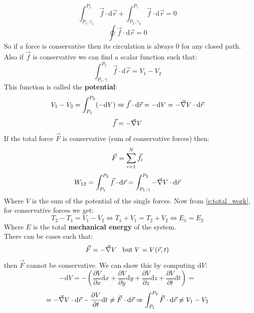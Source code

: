 \begin{equation}
    \int_{P_1,\gamma_1}^{P_2}\vec{f}\cdot\mathrm{d}\vec{r} + \int_{P_2,\gamma_2}^{P_1}\vec{f}\cdot\mathrm{d}\vec{r} = 0
\end{equation}
\begin{equation}
    \oint\vec{f}\cdot\mathrm{d}\vec{r} = 0
\end{equation}
So if a force is conservative then its circulation is always 0 for any closed path.\\
Also if $\vec{f}$ is conservative we can find a scalar function such that:
\begin{equation}
    \int_{P_1,\gamma}^{P_2}\vec{f}\cdot\mathrm{d}\vec{r} = V_1-V_2
\end{equation}
This function is called the \textbf{potential}:
\begin{equation}
    V_1-V_2 = \int_{P_1}^{P_2}(-\mathrm{d}V) \Rightarrow \vec{f}\cdot\mathrm{d}\vec{r} = -\mathrm{d}V = -\vec{\nabla} V \cdot \mathrm{d}\vec{r}
\end{equation}
\begin{equation}
    \vec{f} = -\vec{\nabla} V
\end{equation}
If the total force $\vec{F}$ is conservative (sum of conservative forces) then:
\begin{equation}
    \vec{F} = \displaystyle\sum_{i=1}^{N} \vec{f}_i
\end{equation}
\begin{equation}
    W_{12}=\int_{P_1}^{P_2}\vec{f}\cdot\mathrm{d}\vec{r} = \int_{P_1,\gamma}^{P_2}-\vec{\nabla} V\cdot\mathrm{d}\vec{r}
\end{equation}
Where $V$ is the sum of the potential of the single forces. Now from \eqref{e:total_work}, for conservative forces we get:
\begin{equation} \label{e:mech_energy}
    T_2 - T_1 = V_1 - V_2 \iff T_1 + V_1 = T_2 + V_2\iff E_1 = E_2
\end{equation}
Where $E$ is the total \textbf{mechanical energy} of the system.\\
There can be cases such that:
\begin{equation}
    \vec{F} = -\vec{\nabla} V \;\;\;\mathrm{but}\;V=V(\vec{r},t)
\end{equation}
then $\vec{F}$ cannot be conservative. We can show this by computing $\mathrm{d}V$:
\begin{equation}
    -\mathrm{d}V = -\left(\dfrac{\partial V}{\partial x}\mathrm{d}x + \dfrac{\partial V}{\partial y}\mathrm{d}y + \dfrac{\partial V}{\partial z}\mathrm{d}z + \dfrac{\partial V}{\partial t}\mathrm{d}t\right) =
\end{equation}
\begin{equation}
    = -\vec{\nabla} V \cdot\mathrm{d}\vec{r} - \dfrac{\partial V}{\partial t}\mathrm{d}t \neq \vec{F}\cdot\mathrm{d}\vec{r} \Rightarrow \int_{P_1}^{P_2}\vec{F}\cdot\mathrm{d}\vec{r} \neq V_1-V_2
\end{equation}
